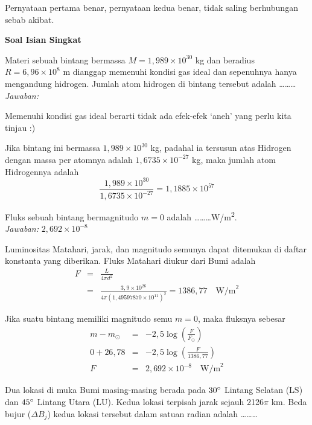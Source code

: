 \documentclass[11pt,fleqn]{exam}
\begin{document}
\begin{questions}
Pernyataan pertama benar, pernyataan kedua benar, tidak saling berhubungan sebab akibat.

\vspace{0.5cm}
\textbf{Soal Isian Singkat}

\question Materi sebuah bintang bermassa $M=1,989\times 10^{30}$ kg dan beradius $R=6,96\times 10^8$ m dianggap memenuhi kondisi gas ideal dan sepenuhnya hanya mengandung hidrogen. Jumlah atom hidrogen di bintang tersebut adalah \ldots\ldots\ldots \\

\textit{Jawaban: }

Memenuhi kondisi gas ideal berarti tidak ada efek-efek `aneh' yang perlu kita tinjau :)

Jika bintang ini bermassa $1,989 \times 10^{30}$ kg, padahal ia tersusun atas Hidrogen dengan massa per atomnya adalah $1,6735 \times 10^{-27}$ kg, maka jumlah atom Hidrogennya adalah 
$$\frac{1,989 \times 10^{30}}{1,6735 \times 10^{-27}} = 1,1885 \times 10^{57}$$


\vspace{0.3cm}
\question Fluks sebuah bintang bermagnitudo $m=0$ adalah \ldots\ldots\ldots W/m\textsuperscript{2}.\\

\textit{Jawaban: } $2,692 \times 10^{-8}$

Luminositas Matahari, jarak, dan magnitudo semunya dapat ditemukan di daftar konstanta yang diberikan. Fluks Matahari diukur dari Bumi adalah
\begin{eqnarray*}
F &=& \frac{L}{4 \pi d^2} \\
  &=& \frac{3,9 \times 10^{26}}{4 \pi (1,49597870 \times 10^{11})^2} = 1386,77 \quad \text{W/m}^{2}
\end{eqnarray*}

Jika suatu bintang memiliki magnitudo semu $m = 0$, maka fluksnya sebesar
\begin{eqnarray*}
m - m_{\odot} &=& -2,5 \log\left(\frac{F}{F_{\odot}}\right)\\
0 + 26,78 &=& -2,5 \log\left(\frac{F}{1386,77}\right)\\
F &=&   2,692 \times 10^{-8} \quad \text{W/m}^{2}
\end{eqnarray*}


\vspace{0.3cm}
\question Dua lokasi di muka Bumi masing-masing berada pada $30\degree$ Lintang Selatan (LS) dan $45\degree$ Lintang Utara (LU). Kedua lokasi terpisah jarak sejauh 2126$\pi$ km. Beda bujur ($\Delta B_j$) kedua lokasi tersebut dalam satuan radian adalah \ldots\ldots\ldots\\


\end{questions}
\end{document}
